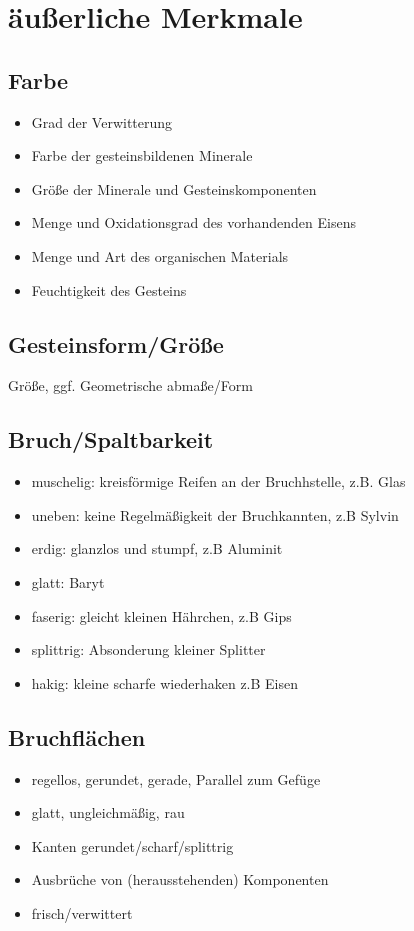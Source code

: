 \documentclass[a4, 12pt]{scrreprt}
\begin{document}
\chapter{äußerliche Merkmale}

\section{Farbe}

\begin{itemize}
\item Grad der Verwitterung
\item Farbe der gesteinsbildenen Minerale
\item Größe der Minerale und Gesteinskomponenten
\item Menge und Oxidationsgrad des vorhandenden Eisens 
\item Menge und Art des organischen Materials
\item Feuchtigkeit des Gesteins
\end{itemize}

\section{Gesteinsform/Größe}
Größe, ggf. Geometrische abmaße/Form

\section{Bruch/Spaltbarkeit}
\begin{itemize}
\item muschelig: kreisförmige Reifen an der Bruchhstelle, z.B. Glas
\item uneben: keine Regelmäßigkeit der Bruchkannten, z.B Sylvin
\item erdig: glanzlos und stumpf, z.B Aluminit
\item glatt: Baryt
\item faserig: gleicht kleinen Hährchen, z.B Gips
\item splittrig: Absonderung kleiner Splitter
\item hakig: kleine scharfe wiederhaken z.B Eisen
\end{itemize}

\section{Bruchflächen}
\begin{itemize}
\item regellos, gerundet, gerade, Parallel zum Gefüge
\item glatt, ungleichmäßig, rau
\item Kanten gerundet/scharf/splittrig
\item Ausbrüche von (herausstehenden) Komponenten
\item frisch/verwittert
\end{itemize}
\end{document}

